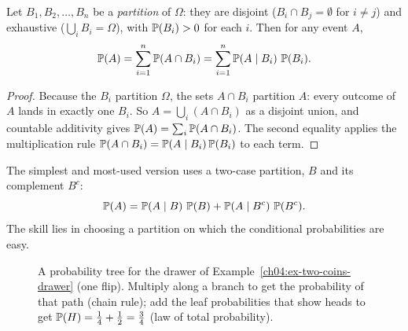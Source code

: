 \begin{theorem}
\label{ch04:lotp}
Let $B_1, B_2, \dots, B_n$ be a \emph{partition} of $\Omega$: they are disjoint ($B_i \cap B_j = \emptyset$ for $i\ne j$) and exhaustive ($\bigcup_i B_i = \Omega$), with $\P(B_i) > 0$ for each $i$. Then for any event $A$,
\[
\P(A) = \sum_{i=1}^{n} \P(A \cap B_i) = \sum_{i=1}^{n} \P(A \given B_i)\,\P(B_i).
\]
\end{theorem}

\begin{proof}
Because the $B_i$ partition $\Omega$, the sets $A \cap B_i$ partition $A$: every outcome of $A$ lands in exactly one $B_i$. So $A = \bigcup_i (A\cap B_i)$ as a disjoint union, and countable additivity gives $\P(A) = \sum_i \P(A\cap B_i)$. The second equality applies the multiplication rule $\P(A\cap B_i) = \P(A\given B_i)\P(B_i)$ to each term.
\end{proof}

The simplest and most-used version uses a two-case partition, $B$ and its complement $B^c$:
\[
\P(A) = \P(A\given B)\,\P(B) + \P(A \given B^c)\,\P(B^c).
\]
The skill lies in choosing a partition on which the conditional probabilities are easy.

\begin{figure}[H]
\centering
{}
\caption{A probability tree for the drawer of Example~\ref{ch04:ex-two-coins-drawer} (one flip). Multiply along a branch to get the probability of that path (chain rule); add the leaf probabilities that show heads to get $\P(H) = \tfrac14 + \tfrac12 = \tfrac34$ (law of total probability).}
\label{ch04:fig-tree}
\end{figure}

